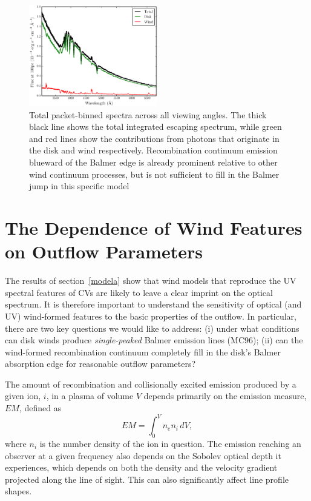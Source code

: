 \documentclass[preprint, a4paper, 11pt]{aastex}
\begin{document}
\begin{figure} 
\includegraphics[width=0.5\textwidth]{figures/fig7_escaping.eps}
\caption{Total packet-binned spectra across all viewing angles. 
The thick black line shows the total 
integrated escaping spectrum, while green and red lines show the contributions from photons that originate in the disk and wind respectively. 
Recombination continuum emission blueward of the Balmer 
edge is already prominent relative to other wind continuum processes, but is not sufficient
to fill in the Balmer jump in this specific model}
\label{cont}
\end{figure} 





%
%

\section{The Dependence of Wind Features on Outflow Parameters}
\label{modelb}

The results of section~\ref{modela} show that wind models that reproduce
the UV spectral features of CVs are likely to leave a clear imprint on
the optical spectrum. It is therefore important to understand the
sensitivity of optical (and UV) wind-formed features to the basic
properties of the outflow. In particular, there are two key questions
we would like to address: (i) under what conditions can disk winds
produce {\em single-peaked} Balmer emission lines (MC96); (ii) can the wind-formed recombination continuum completely
fill in the disk's Balmer absorption edge for reasonable outflow
parameters? 

The amount of recombination and collisionally excited emission
produced by a given ion, $i$, in a plasma of volume $V$ depends
primarily on the emission measure, $EM$, defined as 
\begin{equation}
EM=\int^V_0 n_e n_i \,dV,
\end{equation}
where $n_i$ is the number density of the ion in question.    
The emission reaching an observer at a given frequency also depends on
the Sobolev optical depth it experiences, which depends on both the
density and the velocity gradient projected along the line of
sight. This can also significantly affect line profile shapes. 
\end{document}
